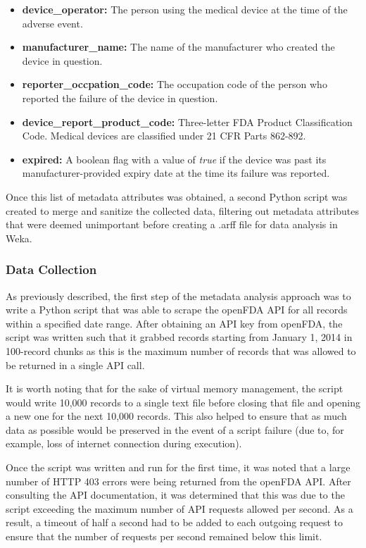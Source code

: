 \documentclass[11pt, notitlepage,abstracton,oneside]{article}   	%
\begin{document}
\begin{itemize}
	\item \textbf{device\_operator:} The person using the medical device at the time of the adverse event.
	\item \textbf{manufacturer\_name:} The name of the manufacturer who created the device in question.
	\item \textbf{reporter\_occpation\_code:} The occupation code of the person who reported the failure of the device in question.
	\item \textbf{device\_report\_product\_code:} Three-letter FDA Product Classification Code. Medical devices are classified under 21 CFR Parts 862-892.
	\item \textbf{expired:} A boolean flag with a value of \textit{true} if the device was past its manufacturer-provided expiry date at the time its failure was reported.
\end{itemize}

Once this list of metadata attributes was obtained, a second Python script was created to merge and sanitize the collected data, filtering out metadata attributes that were deemed unimportant before creating a .arff file for data analysis in Weka.

\subsubsection{Data Collection}
As previously described, the first step of the metadata analysis approach was to write a Python script that was able to scrape the openFDA API for all records within a specified date range. After obtaining an API key from openFDA, the script was written such that it grabbed records starting from January 1, 2014 in 100-record chunks as this is the maximum number of records that was allowed to be returned in a single API call. 

It is worth noting that for the sake of virtual memory management, the script would write 10,000 records to a single text file before closing that file and opening a new one for the next 10,000 records. This also helped to ensure that as much data as possible would be preserved in the event of a script failure (due to, for example, loss of internet connection during execution). 

Once the script was written and run for the first time, it was noted that a large number of HTTP 403 errors were being returned from the openFDA API. After consulting the API documentation, it was determined that this was due to the script exceeding the maximum number of API requests allowed per second. As a result, a timeout of half a second had to be added to each outgoing request to ensure that the number of requests per second remained below this limit.
\end{document}
